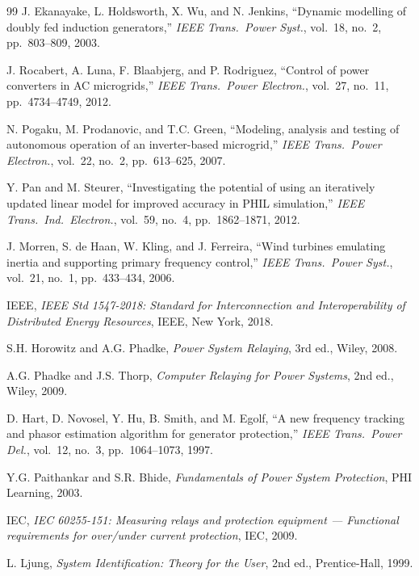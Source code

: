 \documentclass[11pt,a4paper]{report}
\begin{document}
\begin{thebibliography}{99}
J. Ekanayake, L. Holdsworth, X. Wu, and N. Jenkins, ``Dynamic modelling of doubly fed induction generators,'' \textit{IEEE Trans.\ Power Syst.}, vol.~18, no.~2, pp.~803--809, 2003.

J. Rocabert, A. Luna, F. Blaabjerg, and P. Rodriguez, ``Control of power converters in AC microgrids,'' \textit{IEEE Trans.\ Power Electron.}, vol.~27, no.~11, pp.~4734--4749, 2012.

N. Pogaku, M. Prodanovic, and T.C. Green, ``Modeling, analysis and testing of autonomous operation of an inverter-based microgrid,'' \textit{IEEE Trans.\ Power Electron.}, vol.~22, no.~2, pp.~613--625, 2007.

Y. Pan and M. Steurer, ``Investigating the potential of using an iteratively updated linear model for improved accuracy in PHIL simulation,'' \textit{IEEE Trans.\ Ind.\ Electron.}, vol.~59, no.~4, pp.~1862--1871, 2012.

J. Morren, S. de Haan, W. Kling, and J. Ferreira, ``Wind turbines emulating inertia and supporting primary frequency control,'' \textit{IEEE Trans.\ Power Syst.}, vol.~21, no.~1, pp.~433--434, 2006.

IEEE, \textit{IEEE Std 1547-2018: Standard for Interconnection and Interoperability of Distributed Energy Resources}, IEEE, New York, 2018.

S.H. Horowitz and A.G. Phadke, \textit{Power System Relaying}, 3rd ed., Wiley, 2008.

A.G. Phadke and J.S. Thorp, \textit{Computer Relaying for Power Systems}, 2nd ed., Wiley, 2009.

D. Hart, D. Novosel, Y. Hu, B. Smith, and M. Egolf, ``A new frequency tracking and phasor estimation algorithm for generator protection,'' \textit{IEEE Trans.\ Power Del.}, vol.~12, no.~3, pp.~1064--1073, 1997.

Y.G. Paithankar and S.R. Bhide, \textit{Fundamentals of Power System Protection}, PHI Learning, 2003.

IEC, \textit{IEC 60255-151: Measuring relays and protection equipment — Functional requirements for over/under current protection}, IEC, 2009.

L. Ljung, \textit{System Identification: Theory for the User}, 2nd ed., Prentice-Hall, 1999.


\end{thebibliography}
\end{document}
